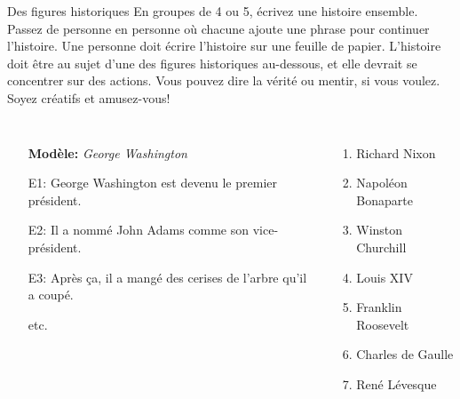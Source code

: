 \begin{frame}{Des figures historiques}
  En groupes de 4 ou 5, écrivez une histoire ensemble.
  Passez de personne en personne où chacune ajoute une phrase pour continuer l'histoire.
  Une personne doit écrire l'histoire sur une feuille de papier.
  L'histoire doit être au sujet d'une des figures historiques au-dessous, et elle devrait se concentrer sur des actions.
  \alert{Vous pouvez dire la vérité ou mentir}, si vous voulez.
  Soyez créatifs et amusez-vous!
  \begin{columns}
      \begin{itemize}
        \item[] \textbf{Modèle:} \emph{George Washington}
        \item[E1:] George Washington est devenu le premier président.
        \item[E2:] Il a nommé John Adams comme son vice-président.
        \item[E3:] Après ça, il a mangé des cerises de l'arbre qu'il a coupé.
        \item[] etc.
      \end{itemize}
      \begin{enumerate}
        \item Richard Nixon
        \item Napoléon Bonaparte
        \item Winston Churchill
        \item Louis XIV
        \item Franklin Roosevelt
        \item Charles de Gaulle
        \item René Lévesque
      \end{enumerate}
  \end{columns}
\end{frame}
